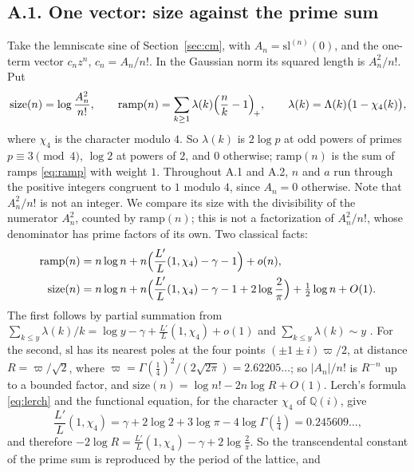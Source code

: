\documentclass[11pt]{amsart}
\numberwithin{equation}{section}
\theoremstyle{definition}
\theoremstyle{remark}
\newcommand{\Q}{\mathbb Q}
\renewcommand{\sl}{\mathrm{sl}}
\begin{document}
\subsection*{A.1. One vector: size against the prime sum}
Take the lemniscate sine of Section~\ref{sec:cm}, with $A_n=\sl^{(n)}(0)$, and the one-term vector $c_nz^n$, $c_n=A_n/n!$. In the Gaussian norm its squared length is $A_n^2/n!$. Put
\begin{equation}\label{eq:exsize}
 \mathrm{size}(n)=\log\frac{A_n^2}{n!},\qquad \mathrm{ramp}(n)=\sum_{k\ge1}\lambda(k)\Bigl(\frac nk-1\Bigr)_{\!+},\qquad\lambda(k)=\Lambda(k)\bigl(1-\chi_4(k)\bigr),
\end{equation}
where $\chi_4$ is the character modulo $4$. So $\lambda(k)$ is $2\log p$ at odd powers of primes $p\equiv3\pmod4$, $\log2$ at powers of $2$, and $0$ otherwise; $\mathrm{ramp}(n)$ is the sum of ramps \eqref{eq:ramp} with weight $1$. Throughout A.1 and A.2, $n$ and $a$ run through the positive integers congruent to $1$ modulo $4$, since $A_n=0$ otherwise. Note that $A_n^2/n!$ is not an integer. We compare its size with the divisibility of the numerator $A_n^2$, counted by $\mathrm{ramp}(n)$; this is not a factorization of $A_n^2/n!$, whose denominator has prime factors of its own. Two classical facts:
\begin{align}
 \mathrm{ramp}(n)&=n\log n+n\Bigl(\frac{L'}{L}(1,\chi_4)-\gamma-1\Bigr)+o(n),\label{eq:exramp}\\
 \mathrm{size}(n)&=n\log n+n\Bigl(\frac{L'}{L}(1,\chi_4)-\gamma-1+2\log\frac2\pi\Bigr)+\tfrac12\log n+O(1).\label{eq:exsizeasym}
\end{align}
The first follows by partial summation from $\sum_{k\le y}\lambda(k)/k=\log y-\gamma+\frac{L'}{L}(1,\chi_4)+o(1)$ and $\sum_{k\le y}\lambda(k)\sim y$ \cite{Davenport}. For the second, $\sl$ has its nearest poles at the four points $(\pm1\pm i)\varpi/2$, at distance $R=\varpi/\sqrt2$, where $\varpi=\Gamma(\frac14)^2/(2\sqrt{2\pi})=2.62205\ldots$; so $|A_n|/n!$ is $R^{-n}$ up to a bounded factor, and $\mathrm{size}(n)=\log n!-2n\log R+O(1)$. Lerch's formula \eqref{eq:lerch} and the functional equation, for the character $\chi_4$ of $\Q(i)$, give
\begin{equation}\label{eq:exL4}
 \frac{L'}{L}(1,\chi_4)=\gamma+2\log2+3\log\pi-4\log\Gamma(\tfrac14)=0.245609\ldots,
\end{equation}
and therefore $-2\log R=\frac{L'}{L}(1,\chi_4)-\gamma+2\log\frac2\pi$. So the transcendental constant of the prime sum is reproduced by the period of the lattice, and
\end{document}
